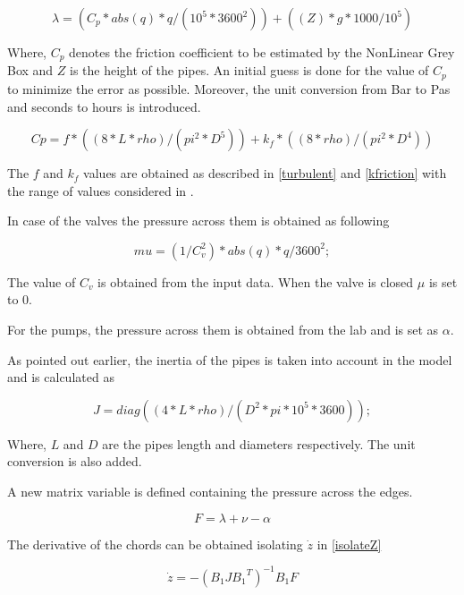 \begin{equation}
\lambda = (C_p * abs(q)*q /(10^5*3600^2)) + ((Z)*g*1000/10^5)
\end{equation}

Where, $C_p$ denotes the friction coefficient to be estimated by the NonLinear Grey Box and $Z$ is the height of the pipes. An initial guess is done for the value of $C_p$ to minimize the error 
as possible. Moreover, the unit conversion from Bar to Pas and seconds to hours is introduced.

\begin{equation}
  Cp= f*((8*L*rho)/(pi^2*D^5))+k_f*((8*rho)/(pi^2*D^4))
\end{equation}

The $f$ and $k_f$ values are obtained as described in \eqref{turbulent} and \eqref{kfriction} with the range of values considered in .

In case of the valves the pressure across them is obtained as following

\begin{equation}
  mu = (1/C_v^2)* abs(q)*q /3600^2;
\end{equation}

The value of $C_v$ is obtained from the input data. When the valve is closed $\mu$ is set to 0. 

For the pumps, the pressure across them is obtained from the lab and is set as $\alpha$. 

As pointed out earlier, the inertia of the pipes is taken into account in the model and is calculated as

\begin{equation}
  J = diag((4*L*rho)/(D^2*pi*10^5*3600));
\end{equation}

Where, $L$ and $D$ are the pipes length and diameters respectively. The unit conversion is also added. 

A new matrix variable is defined containing the pressure across the edges.

\begin{equation}
  F = \lambda + \nu - \alpha
\end{equation}

The derivative of the chords can be obtained isolating $\dot{z}$ in \eqref{isolateZ}

\begin{equation}
  \dot{z}  =  - (B_1 J {B_1}^T)^{-1}B_1 F
  \label{chordder}
\end{equation}

